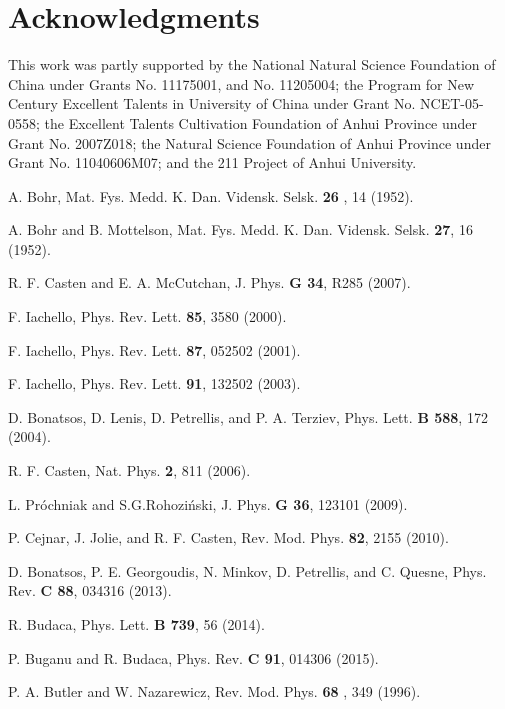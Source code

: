 \documentclass[twocolumn,prc,showpacs,preprintnumbers,superscriptaddress,floatfix]{revtex4}
\begin{document}
\section{Acknowledgments}

This work was partly supported by the National Natural Science Foundation of
China under Grants No. 11175001, and No. 11205004; the Program for New
Century Excellent Talents in University of China under Grant No.
NCET-05-0558; the Excellent Talents Cultivation Foundation of Anhui Province
under Grant No. 2007Z018; the Natural Science Foundation of Anhui Province
under Grant No. 11040606M07; and the 211 Project of Anhui University.

\begin{thebibliography}{99}
 A. Bohr, Mat. Fys. Medd. K. Dan. Vidensk. Selsk. \textbf{26%
}, 14 (1952).

 A. Bohr and B. Mottelson, Mat. Fys. Medd. K. Dan. Vidensk.
Selsk. \textbf{27}, 16 (1952).

 R. F. Casten and E. A. McCutchan, J. Phys. \textbf{G 34},
R285 (2007).

 F. Iachello, Phys. Rev. Lett. \textbf{85}, 3580 (2000).

 F. Iachello, Phys. Rev. Lett. \textbf{87}, 052502
(2001).

 F. Iachello, Phys. Rev. Lett. \textbf{91}, 132502
(2003).

 D. Bonatsos, D. Lenis, D. Petrellis, and P. A. Terziev,
Phys. Lett. \textbf{B 588}, 172 (2004).

 R. F. Casten, Nat. Phys. \textbf{2}, 811 (2006).

 L. Pr\'ochniak and S.G.Rohozi\'nski, J. Phys. \textbf{%
G 36}, 123101 (2009).

 P. Cejnar, J. Jolie, and R. F. Casten, Rev. Mod. Phys.
\textbf{82}, 2155 (2010).

 D. Bonatsos, P. E. Georgoudis, N. Minkov, D. Petrellis,
and C. Quesne, Phys. Rev. \textbf{C 88}, 034316 (2013).

 R. Budaca, Phys. Lett. \textbf{B 739}, 56 (2014).

 P. Buganu and R. Budaca, Phys. Rev. \textbf{C 91}, 014306
(2015).

 P. A. Butler and W. Nazarewicz, Rev. Mod. Phys. \textbf{68%
}, 349 (1996).


\end{thebibliography}
\end{document}
